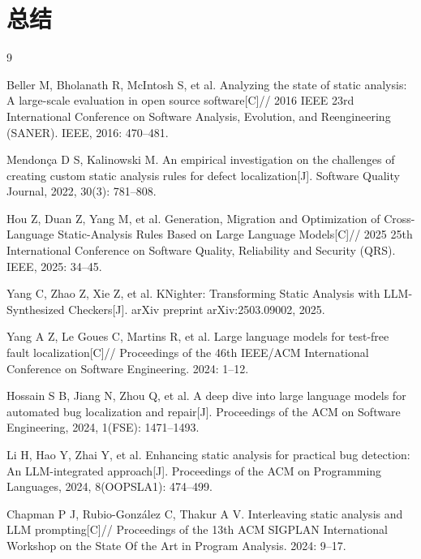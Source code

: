 \documentclass[a4paper,12pt,UTF8]{ctexart}
\numberwithin{figure}{section}
\numberwithin{table}{section}
\numberwithin{equation}{section}
\begin{document}
\newpage

\section{总结}

\newpage

\begin{thebibliography}{9}
\setlength{\itemsep}{-1mm}

  Beller M, Bholanath R, McIntosh S, et al. Analyzing the state of static analysis: A large-scale evaluation in open source software[C]// 2016 IEEE 23rd International Conference on Software Analysis, Evolution, and Reengineering (SANER). IEEE, 2016: 470--481.

  Mendonça D S, Kalinowski M. An empirical investigation on the challenges of creating custom static analysis rules for defect localization[J]. Software Quality Journal, 2022, 30(3): 781--808.

  Hou Z, Duan Z, Yang M, et al. Generation, Migration and Optimization of Cross-Language Static-Analysis Rules Based on Large Language Models[C]// 2025 25th International Conference on Software Quality, Reliability and Security (QRS). IEEE, 2025: 34--45.

  Yang C, Zhao Z, Xie Z, et al. KNighter: Transforming Static Analysis with LLM-Synthesized Checkers[J]. arXiv preprint arXiv:2503.09002, 2025.

  Yang A Z, Le Goues C, Martins R, et al. Large language models for test-free fault localization[C]// Proceedings of the 46th IEEE/ACM International Conference on Software Engineering. 2024: 1--12.

  Hossain S B, Jiang N, Zhou Q, et al. A deep dive into large language models for automated bug localization and repair[J]. Proceedings of the ACM on Software Engineering, 2024, 1(FSE): 1471--1493.

  Li H, Hao Y, Zhai Y, et al. Enhancing static analysis for practical bug detection: An LLM-integrated approach[J]. Proceedings of the ACM on Programming Languages, 2024, 8(OOPSLA1): 474--499.

  Chapman P J, Rubio-González C, Thakur A V. Interleaving static analysis and LLM prompting[C]// Proceedings of the 13th ACM SIGPLAN International Workshop on the State Of the Art in Program Analysis. 2024: 9--17.

\end{thebibliography}
\end{document}
